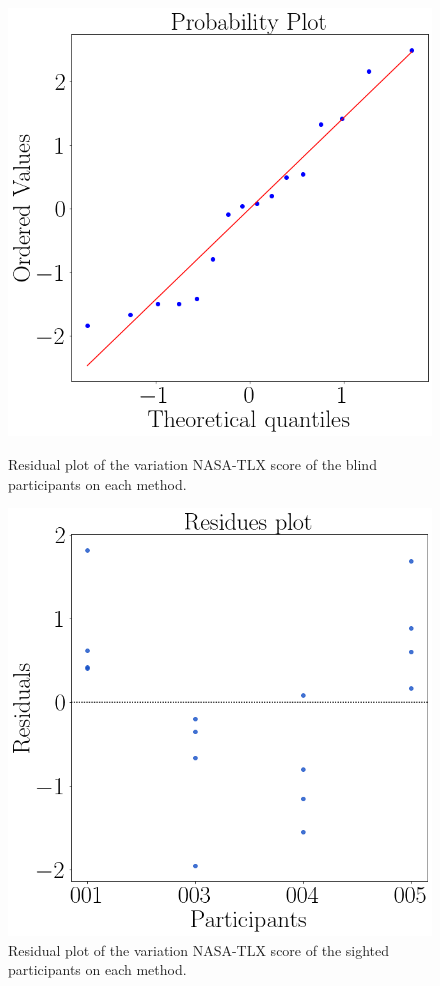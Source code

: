 \begin{figure}[!htb]
    \centering
    \begin{minipage}{0.45\textwidth}
        \centering
        \includegraphics[width = 0.8\linewidth]{Resultados/Nasa/Figuras/png/qqplot_nasa_var_sight.png}
        \caption{Residual plot of the variation NASA-TLX score of the blind participants on each method.}
        \label{fig:qqplot_nasa_var_sight}
    \end{minipage}
    \begin{minipage}{0.45\textwidth}
        \centering
        \includegraphics[width = 0.8\linewidth]{Resultados/Nasa/Figuras/png/residplot_nasa_var_sight.png}
        \caption{Residual plot of the variation NASA-TLX score of the sighted participants on each method.}
        \label{fig:residplot_nasa_var_sight}
    \end{minipage}
\end{figure}

